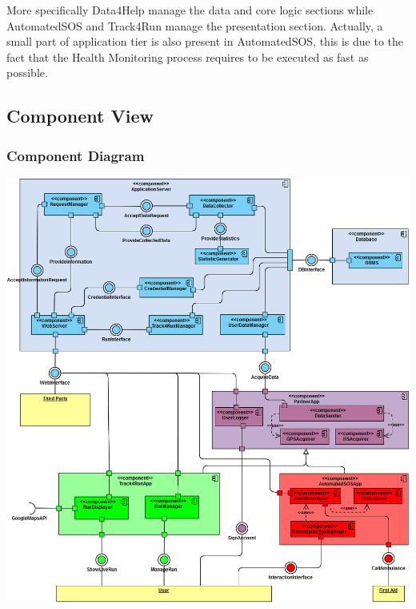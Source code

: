 More specifically Data4Help manage the data and core logic sections while AutomatedSOS and Track4Run manage the presentation section. Actually, a small part of application tier is also present in AutomatedSOS, this is due to the fact that the Health Monitoring process requires to be executed as fast as possible.

\subsection{Component View}

\subsubsection{Component Diagram}

\includegraphics[scale=0.5]{Images/ComponentDiagram.png}


